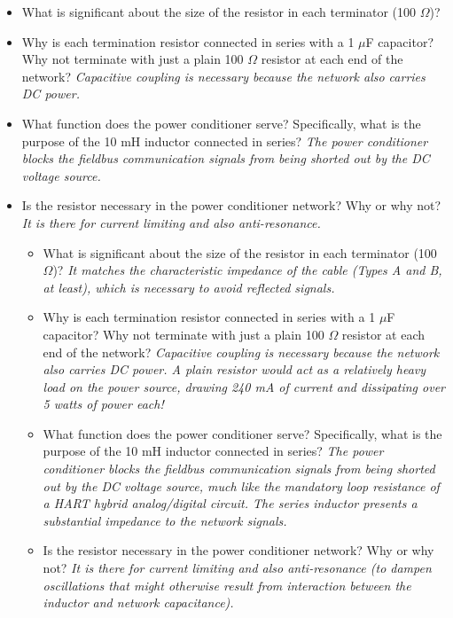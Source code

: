 \begin{itemize}
\begin{itemize}
\item{} What is significant about the size of the resistor in each terminator (100 $\Omega$)?
\vskip 10pt
\item{} Why is each termination resistor connected in series with a 1 $\mu$F capacitor?  Why not terminate with just a plain 100 $\Omega$ resistor at each end of the network? {\it Capacitive coupling is necessary because the network also carries DC power.}
\vskip 10pt
\item{} What function does the power conditioner serve?  Specifically, what is the purpose of the 10 mH inductor connected in series?  {\it The power conditioner blocks the fieldbus communication signals from being shorted out by the DC voltage source.}
\vskip 10pt
\item{} Is the resistor necessary in the power conditioner network?  Why or why not? {\it It is there for current limiting and also anti-resonance.}
\vskip 10pt
\medskip







\begin{itemize}
\item{} What is significant about the size of the resistor in each terminator (100 $\Omega$)?  {\it It matches the characteristic impedance of the cable (Types A and B, at least), which is necessary to avoid reflected signals.}
\vskip 10pt
\item{} Why is each termination resistor connected in series with a 1 $\mu$F capacitor?  Why not terminate with just a plain 100 $\Omega$ resistor at each end of the network? {\it Capacitive coupling is necessary because the network also carries DC power.  A plain resistor would act as a relatively heavy load on the power source, drawing 240 mA of current and dissipating over 5 watts of power each!}
\vskip 10pt
\item{} What function does the power conditioner serve?  Specifically, what is the purpose of the 10 mH inductor connected in series?  {\it The power conditioner blocks the fieldbus communication signals from being shorted out by the DC voltage source, much like the mandatory loop resistance of a HART hybrid analog/digital circuit.  The series inductor presents a substantial impedance to the network signals.}
\vskip 10pt
\item{} Is the resistor necessary in the power conditioner network?  Why or why not? {\it It is there for current limiting and also anti-resonance (to dampen oscillations that might otherwise result from interaction between the inductor and network capacitance).}
\vskip 10pt
\medskip


\end{itemize}
\end{itemize}
\end{itemize}
